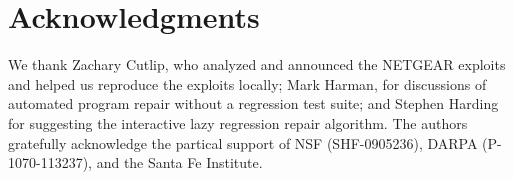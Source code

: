 \documentclass{sigcomm-alternate}
\begin{document}
\section{Acknowledgments}
\label{sec-7}
We thank Zachary Cutlip, who analyzed and announced
the NETGEAR exploits and helped us reproduce the exploits
locally;
Mark Harman, for discussions of automated program repair without a
regression test suite; and Stephen Harding for suggesting the
interactive lazy regression repair algorithm.  The authors gratefully
acknowledge the partical support of NSF (SHF-0905236),
DARPA (P-1070-113237), and the Santa Fe Institute.



\end{document}
